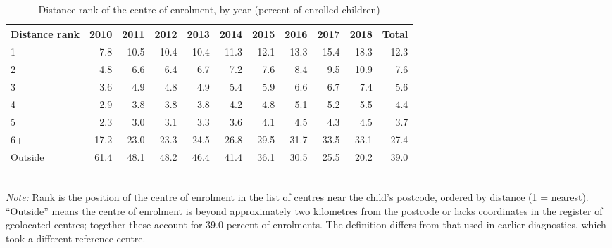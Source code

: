 \begin{table}[htbp]\centering
\caption{Distance rank of the centre of enrolment, by year (percent of enrolled children)}
\label{tab:T5a_rank}
\small
\setlength{\tabcolsep}{4pt}
\begin{tabular}{lrrrrrrrrrr}
\toprule
Distance rank & 2010 & 2011 & 2012 & 2013 & 2014 & 2015 & 2016 & 2017 & 2018 & Total \\
\midrule
1 & 7.8 & 10.5 & 10.4 & 10.4 & 11.3 & 12.1 & 13.3 & 15.4 & 18.3 & 12.3 \\
2 & 4.8 & 6.6 & 6.4 & 6.7 & 7.2 & 7.6 & 8.4 & 9.5 & 10.9 & 7.6 \\
3 & 3.6 & 4.9 & 4.8 & 4.9 & 5.4 & 5.9 & 6.6 & 6.7 & 7.4 & 5.6 \\
4 & 2.9 & 3.8 & 3.8 & 3.8 & 4.2 & 4.8 & 5.1 & 5.2 & 5.5 & 4.4 \\
5 & 2.3 & 3.0 & 3.1 & 3.3 & 3.6 & 4.1 & 4.5 & 4.3 & 4.5 & 3.7 \\
6+ & 17.2 & 23.0 & 23.3 & 24.5 & 26.8 & 29.5 & 31.7 & 33.5 & 33.1 & 27.4 \\
Outside & 61.4 & 48.1 & 48.2 & 46.4 & 41.4 & 36.1 & 30.5 & 25.5 & 20.2 & 39.0 \\
\bottomrule
\end{tabular}
\\[3pt]{\footnotesize \textit{Note:} Rank is the position of the centre of enrolment in the list of centres near the child's postcode, ordered by distance (1 = nearest). ``Outside'' means the centre of enrolment is beyond approximately two kilometres from the postcode or lacks coordinates in the register of geolocated centres; together these account for 39.0 percent of enrolments. The definition differs from that used in earlier diagnostics, which took a different reference centre.}
\end{table}
